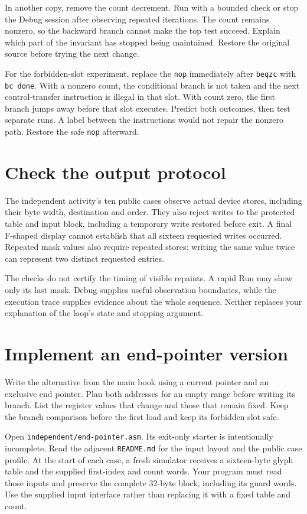 In another copy, remove the count decrement. Run with a bounded check or stop the
Debug session after observing repeated iterations. The count remains nonzero,
so the backward branch cannot make the top test succeed. Explain which part of
the invariant has stopped being maintained. Restore the original source before
trying the next change.

For the forbidden-slot experiment, replace the \texttt{nop} immediately after
\texttt{beqzc} with \texttt{bc done}. With a nonzero count, the conditional branch
is not taken and the next control-transfer instruction is illegal in that slot.
With count zero, the first branch jumps away before that slot executes. Predict
both outcomes, then test separate runs. A label between the instructions would
not repair the nonzero path. Restore the safe \texttt{nop} afterward.

\section{Check the output protocol}

The independent activity's ten public cases observe actual device stores,
including their byte width, destination and order. They also reject writes to
the protected table and input block, including a temporary write restored before
exit. A final F-shaped display cannot establish that all sixteen
requested writes occurred. Repeated mask values also require repeated stores:
writing the same value twice can represent two distinct requested entries.

The checks do not certify the timing of visible repaints. A rapid Run may show
only its last mask. Debug supplies useful observation boundaries, while the
execution trace supplies evidence about the whole sequence. Neither replaces
your explanation of the loop's state and stopping argument.

\section{Implement an end-pointer version}

Write the alternative from the main book using a current pointer and an exclusive
end pointer. Plan both addresses for an empty range before writing its branch.
List the register values that change and those that remain fixed. Keep the branch
comparison before the first load and keep its forbidden slot safe.

Open \texttt{independent/end-pointer.asm}. Its exit-only starter is intentionally
incomplete. Read the adjacent \texttt{README.md} for the input layout and the
public case profile. At the start of each case, a fresh simulator receives a
sixteen-byte glyph table and the supplied first-index and count words. Your
program must read those inputs and preserve the complete 32-byte block, including
its guard words. Use the supplied input interface rather than replacing it with
a fixed table and count.

